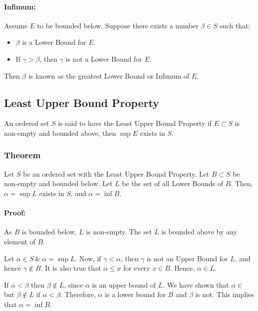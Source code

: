 \documentclass[12pt, oneside]{book}
\theoremstyle{definition}
\begin{document}
\paragraph{Infimum:} Assume \(E\) to be bounded below.
Suppose there exists a number \(\beta \in S\) such that:
\begin{itemize}
	\item \(\beta\) is a Lower Bound for \(E\).
	\item If \(\gamma > \beta\), then \(\gamma\) is not a Lower Bound for \(E\).
\end{itemize}
Then \( \beta \) is known as the greatest Lower Bound or Infimum of \(E\).

\subsection{Least Upper Bound Property}
An ordered set \(S\) is said to have the Least Upper Bound Property if \(E \subset S\) is non-empty and bounded above, then \( \sup E\) exists in \(S\).

\subsubsection{Theorem}
Let \(S\) be an ordered set with the Least Upper Bound Property.
Let \(B \subset S\) be non-empty and bounded below.
Let \(L\) be the set of all Lower Bounds of \(B\).
Then, \( \alpha = \sup L \) exists in \(S\), and \(\alpha = \inf B\).

\paragraph{Proof:} As \(B\) is bounded below, \(L\) is non-empty.
The set \(L\) is bounded above by any element of \(B\).

Let \( \alpha \in S \: \& \: \alpha = \sup L \).
Now, if \( \gamma < \alpha \), then \(\gamma\) is not an Upper Bound for \(L\), and hence \( \gamma \notin B \).
It is also true that \( \alpha \leq x \) for every \( x \in B \).
Hence, \( \alpha \in L \).

If \( \alpha < \beta \) then \( \beta \notin L \), since \( \alpha \) is an upper bound of \(L\).
We have shown that \( \alpha \in \) but \(\beta \notin L\) if \( \alpha < \beta \).
Therefore, \( \alpha \) is a lower bound for \(B\) and \(\beta\) is not.
This implies that \( \alpha = \inf B \).
\end{document}
